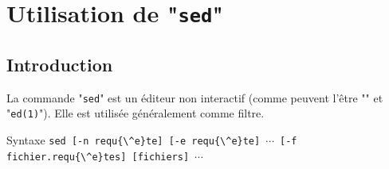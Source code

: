 %
%

\setcounter{remarque-cnt}{1}
\setcounter{example-cnt}{1}
\chapter{\label{adv-fltrs-sed}Utilisation de "{\tt sed}"}

\section{Introduction}

La commande "{\tt sed}" est un {\'e}diteur non interactif (comme peuvent
l'{\^e}tre "" et "{\tt ed(1)}"). Elle est utilis{\'e}e 
g{\'e}n{\'e}ralement comme filtre.

\begin{definition}{Syntaxe}
\verb=sed [-n requ{\^e}te] [-e requ{\^e}te]=~$\cdots$~\verb=[-f fichier.requ{\^e}tes] [fichiers]=~$\cdots$
\end{definition}

